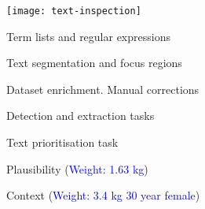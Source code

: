 \documentclass[landscape,footrule]{foils}
\begin{document}
\begin{minipage}[b]{16cm}
\texttt{[image: text-inspection]}
\vspace*{-2ex}
\begin{triangles}
\item Term lists and regular expressions 
\item Text segmentation and focus regions
\item Dataset enrichment.  Manual corrections 
\end{triangles}\vspace*{3ex}
\begin{triangles}
\item Detection and extraction tasks
\item Text prioritisation task
\end{triangles}\vspace*{5ex}
\begin{triangles}
\item Plausibility (\textcolor{blue}{Weight: 1.63 kg})
\item Context (\textcolor{blue}{Weight: 3.4 kg 30 year female})
\vspace*{2ex}
\end{triangles}
\end{minipage}




\end{document}
